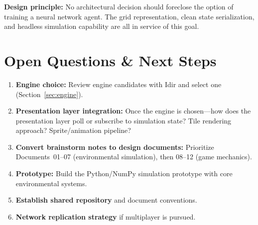 \documentclass[11pt,a4paper]{article}
\begin{document}
\medskip
\noindent\textbf{Design principle:}  No architectural decision should
foreclose the option of training a neural network agent.  The grid
representation, clean state serialization, and headless simulation
capability are all in service of this goal.

\section{Open Questions \& Next Steps}

\begin{enumerate}
    \item \textbf{Engine choice:} Review engine candidates with Idir
          and select one (Section~\ref{sec:engine}).
    \item \textbf{Presentation layer integration:} Once the engine is
          chosen---how does the presentation layer poll or subscribe to
          simulation state?  Tile rendering approach?  Sprite/animation
          pipeline?
    \item \textbf{Convert brainstorm notes to design documents:}
          Prioritize Documents~01--07 (environmental simulation), then
          08--12 (game mechanics).
    \item \textbf{Prototype:} Build the Python/NumPy simulation
          prototype with core environmental systems.
    \item \textbf{Establish shared repository} and document conventions.
    \item \textbf{Network replication strategy} if multiplayer is
          pursued.
\end{enumerate}
\end{document}
